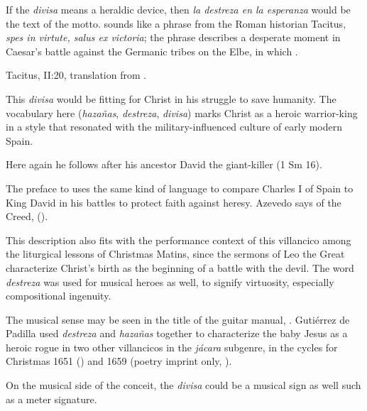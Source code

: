 If the \emph{divisa} means a heraldic device, then \emph{la destreza en la
esperanza} would be the text of the motto.
 sounds like a phrase from the Roman historian
Tacitus, \emph{spes in virtute, salus ex victoria}; the phrase describes a
desperate moment in Caesar's battle against the Germanic tribes on the Elbe, in
which .%
\begin{Footnote}
    Tacitus,  II:20, translation from
    \autocite[49]{Tacitus:Annales-English}.
\end{Footnote}
This \emph{divisa} would be fitting for Christ in his struggle to save humanity.
The vocabulary here (\emph{hazañas}, \emph{destreza}, \emph{divisa}) marks
Christ as a heroic warrior-king in a style that resonated with the
military-influenced culture of early modern Spain. 

Here again he follows after his ancestor David the giant-killer (1 Sm 16).%
\begin{Footnote}
    The preface to \autocite{Azevedo:Catecismo} uses the same kind of language
    to compare Charles I of Spain to King David in his battles to protect faith
    against heresy. 
    Azevedo says of the Creed,  ().
\end{Footnote}
This description also fits with the performance context of this villancico among
the liturgical lessons of Christmas Matins, since the sermons of Leo the Great
characterize Christ's birth as the beginning of a battle with the devil.
The word \emph{destreza} was used for musical heroes as well, to signify
virtuosity, especially compositional ingenuity.%
\begin{Footnote}
    \Autocite
    [: ]
    {Covarrubias:Tesoro}
    The musical sense may be seen in the title of the guitar manual,
    \autocite{Sanz:Guitarra}.
    Gutiérrez de Padilla used \emph{destreza} and \emph{hazañas} together to
    characterize the baby Jesus as a heroic rogue in two other villancicos in
    the \emph{jácara} subgenre, in the cycles for Christmas 1651
    () and 1659 (poetry imprint only,
    ).
\end{Footnote}
On the musical side of the conceit, the \emph{divisa} could be a musical sign as
well such as a meter signature.

